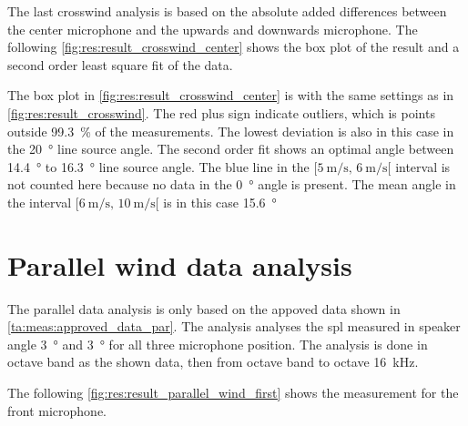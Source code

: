 The last crosswind analysis is based on the absolute added differences between the center microphone and the upwards and downwards microphone. The following \autoref{fig:res:result_crosswind_center} shows the box plot of the result and a second order least square fit of the data. 
 

The box plot in \autoref{fig:res:result_crosswind_center} is with the same settings as in  \autoref{fig:res:result_crosswind}. The red plus sign indicate outliers, which is points outside \SI{99.3}{\percent} of the measurements. The lowest deviation is also in this case in the \SI{20}{\degree} line source angle. The second order fit shows an optimal angle between \SI{14.4}{\degree} to \SI{16.3}{\degree} line source angle. The blue line in the $[\SI{5}{\meter\per\second},\, \SI{6}{\meter\per\second}[ $ interval is not counted here because no data in the \SI{0}{\degree} angle is present. The mean angle in the interval $[\SI{6}{\meter\per\second},\, \SI{10}{\meter\per\second}[ $ is in this case \SI{15.6}{\degree}
  
  

\section{Parallel wind data analysis}\label{res:par_data_ana}

The parallel data analysis is only based on the appoved data shown in \autoref{ta:meas:approved_data_par}. The analysis analyses the \gls{spl} measured in speaker angle \SI{3}{\degree} and  \SI{3}{\degree} for all three microphone position. The analysis is done in octave band as the shown data, then from octave band  to octave \SI{16}{\kilo\hertz}. 

 The following \autoref{fig:res:result_parallel_wind_first}  shows the measurement for the front microphone.

  

